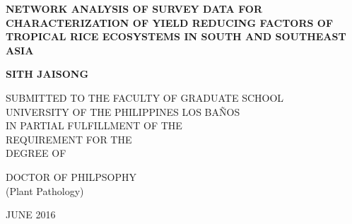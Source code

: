 \pagestyle{empty}

\begin{titlepage}
\begin{spacing}{1}
        \begin{center}
        \vspace*{0cm}

        \large
        {\bf NETWORK ANALYSIS OF SURVEY DATA FOR CHARACTERIZATION OF YIELD REDUCING FACTORS OF TROPICAL RICE ECOSYSTEMS IN SOUTH AND SOUTHEAST ASIA}

        \vspace*{6.0cm}

        \large
        \bf{SITH JAISONG} \\

        \vspace*{5.0cm}

        \large
        SUBMITTED TO THE FACULTY OF GRADUATE SCHOOL\\
        UNIVERSITY OF THE PHILIPPINES LOS BA\~NOS\\ 
        IN PARTIAL FULFILLMENT OF THE \\
        REQUIREMENT FOR THE \\ 
        DEGREE OF \\
        \vspace*{2.0cm}
        \begin{singlespace}
        DOCTOR OF PHILPSOPHY \\
        (Plant Pathology) \\
		\end{singlespace}
        \vspace*{2.0cm}
        JUNE 2016
        \end{center}
        \end{spacing}
\end{titlepage}
\cleardoublepage